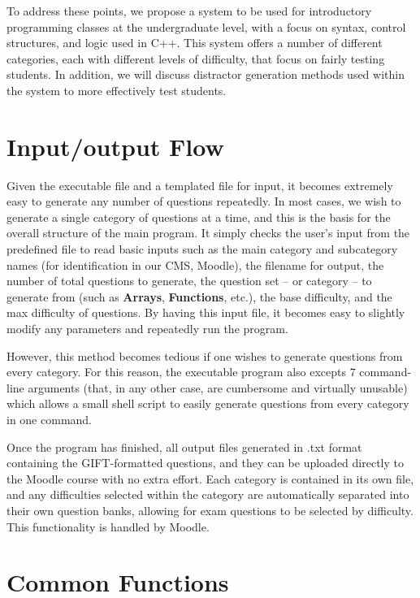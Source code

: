 \documentclass{article}
\begin{document}
To address these points, we propose a system to be used for introductory programming classes at the undergraduate level, with a focus on syntax, control structures, and logic used in C++. This system offers a number of different categories, each with different levels of difficulty, that focus on fairly testing students. In addition, we will discuss distractor generation methods used within the system to more effectively test students.

\section{Input/output Flow} \label{sec-input/output_flow}

Given the executable file and a templated file for input, it becomes extremely easy to generate any number of questions
repeatedly. In most cases, we wish to generate a single category of questions at a time, and this is the basis for the
overall structure of the main program. It simply checks the user's input from the predefined file to read basic inputs
such as the main category and subcategory names (for identification in our CMS, Moodle), the filename for output, the number of
total questions to generate, the question set -- or category -- to generate from (such as \textbf{Arrays}, \textbf{Functions}, etc.),
the base difficulty, and the max difficulty of questions. By having this input file, it becomes easy to slightly modify
any parameters and repeatedly run the program.

However, this method becomes tedious if one wishes to generate questions from every category. For this reason, the
executable program also excepts 7 command-line arguments (that, in any other case, are cumbersome and virtually
unusable) which allows a small shell script to easily generate questions from every category in one command.

Once the program has finished, all output files generated in .txt format containing the GIFT-formatted questions, and they can be uploaded
directly to the Moodle course with no extra effort. Each category is contained in its own file, and any
difficulties selected within the category are automatically separated into their own question banks, allowing
for exam questions to be selected by difficulty. This functionality is handled by Moodle.


\section{Common Functions} \label{sec-common_functions}
\end{document}
